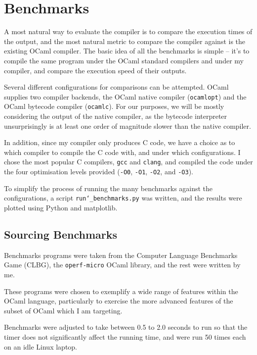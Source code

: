 \documentclass[12pt,a4paper,twoside,openright]{report}
\begin{document}
\section{Benchmarks}

A most natural way to evaluate the compiler is to compare the execution times 
of the output, and the most natural metric to compare the compiler against is 
the existing OCaml compiler. The basic idea of all the benchmarks is simple -- 
it's to compile the same program under the OCaml standard compilers and under 
my compiler, and compare the execution speed of their outputs.

Several different configurations for comparisons can be attempted. OCaml 
supplies two compiler backends, the OCaml native compiler (\texttt{ocamlopt}) 
and the OCaml bytecode compiler (\texttt{ocamlc}). For our purposes, we will be 
mostly considering the output of the native compiler, as the bytecode 
interpreter unsurprisingly is at least one order of magnitude slower than the 
native compiler.

In addition, since my compiler only produces C code, we have a choice as to 
which compiler to compile the C code with, and under which configurations. I 
chose the most popular C compilers, \texttt{gcc} and \texttt{clang}, and 
compiled the code under the four optimisation levels provided (\texttt{-O0}, 
\texttt{-O1}, \texttt{-O2}, and \texttt{-O3}).

To simplify the process of running the many benchmarks against the
configurations, a script \texttt{run\char`_benchmarks.py} was written, and the
results were plotted using Python and matplotlib.

\subsection{Sourcing Benchmarks}

Benchmarks programs were taken from the Computer Language Benchmarks Game 
(CLBG)\cite{benchmarks-game}, the \texttt{operf-micro}\cite{operf-micro} OCaml 
library, and the rest were written by me.

These programs were chosen to exemplify a wide range of features within the 
OCaml language, particularly to exercise the more advanced features of the 
subset of OCaml which I am targeting.

Benchmarks were adjusted to take between 0.5 to 2.0 seconds to run so that the 
timer does not significantly affect the running time, and were run 50 times 
each on an idle Linux laptop.
\end{document}
